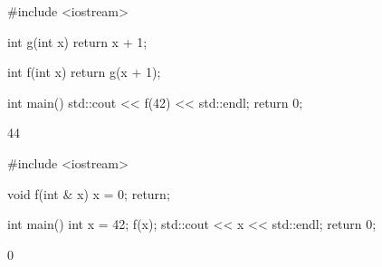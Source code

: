 \newpage
\nextq
\begin{console}[fontsize=\footnotesize]
#include <iostream>

int g(int x)
{
    return x + 1;
}

int f(int x)
{
    return g(x + 1);
}

int main()
{
    std::cout << f(42) << std::endl;
    return 0;
}
\end{console}
\ANSWER
\begin{answercode}
44
\end{answercode}

\nextq
\begin{console}[fontsize=\footnotesize]
#include <iostream>

void f(int & x)
{
    x = 0;
    return;
}

int main()
{
    int x = 42;
    f(x);
    std::cout << x << std::endl;
    return 0;
}
\end{console}
\ANSWER
\begin{answercode}
0
\end{answercode}


